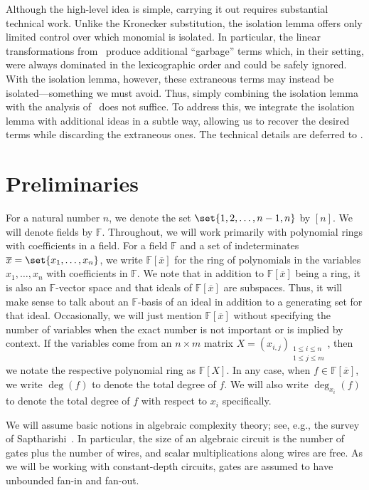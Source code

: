 \documentclass[10pt,a4paper]{amsart}
\newcommand*\eg{e.g.}
\newcommand*\F{\mathbb{F}}
\begin{document}
Although the high-level idea is simple, carrying it out requires substantial technical work.
Unlike the Kronecker substitution, the isolation lemma offers only limited control over which monomial is isolated.
In particular, the linear transformations from~\cite{AF21} produce additional ``garbage'' terms which, in their setting, were always dominated in the lexicographic order and could be safely ignored.
With the isolation lemma, however, these extraneous terms may instead be isolated—something we must avoid.
Thus, simply combining the isolation lemma with the analysis of~\cite{AF21} does not suffice.
To address this, we integrate the isolation lemma with additional ideas in a subtle way, allowing us to recover the desired terms while discarding the extraneous ones.
The technical details are deferred to .

\section{Preliminaries}\label{sec:prelims}

For a natural number $n$, we denote the set $\set{1, 2, \ldots, n - 1, n}$ by $[n]$.
We will denote fields by $\F$.
Throughout, we will work primarily with polynomial rings with coefficients in a field.
For a field $\F$ and a set of indeterminates $\overline{x} = \set{x_1, \ldots, x_n}$, we write $\F[\overline{x}]$ for the ring of polynomials in the variables $x_1, \ldots, x_n$ with coefficients in $\F$.
We note that in addition to $\F[\overline{x}]$ being a ring, it is also an $\F$-vector space and that ideals of $\F[\overline{x}]$ are subspaces.
Thus, it will make sense to talk about an $\F$-basis of an ideal in addition to a generating set for that ideal.
Occasionally, we will just mention $\F[\overline{x}]$ without specifying the number of variables when the exact number is not important or is implied by context.
If the variables come from an $n \times m$ matrix $X = (x_{i, j})_{\substack{1 \leq i \leq n \\ 1 \leq j \leq m}}$, then we notate the respective polynomial ring as $\F[X]$.
In any case, when $f \in \F[\overline{x}]$, we write $\deg(f)$ to denote the total degree of $f$.
We will also write $\deg_{x_{i}}(f)$ to denote the total degree of $f$ with respect to $x_{i}$ specifically.

We will assume basic notions in algebraic complexity theory; see, \eg, the survey of Saptharishi~\cite{Sap21}.
In particular, the size of an algebraic circuit is the number of gates plus the number of wires, and scalar multiplications along wires are free.
As we will be working with constant-depth circuits, gates are assumed to have unbounded fan-in and fan-out.
\end{document}
